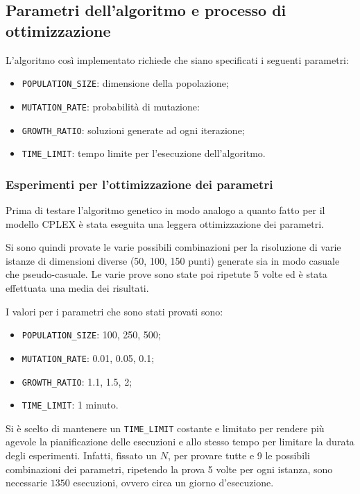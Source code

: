 \subsection{Parametri dell'algoritmo e processo di ottimizzazione}

L'algoritmo così implementato richiede che siano specificati i seguenti parametri:

\begin{itemize}
	\item\texttt{POPULATION\_SIZE}: dimensione della popolazione;
	\item\texttt{MUTATION\_RATE}: probabilità di mutazione:
	\item\texttt{GROWTH\_RATIO}: soluzioni generate ad ogni iterazione;
	\item\texttt{TIME\_LIMIT}: tempo limite per l'esecuzione dell'algoritmo.
\end{itemize}

\subsubsection{Esperimenti per l'ottimizzazione dei parametri}

Prima di testare l'algoritmo genetico in modo analogo a quanto fatto per il modello CPLEX è stata eseguita una leggera ottimizzazione dei parametri.

Si sono quindi provate le varie possibili combinazioni per la risoluzione di varie istanze di dimensioni diverse (50, 100, 150 punti) generate sia in modo casuale che pseudo-casuale.
Le varie prove sono state poi ripetute 5 volte ed è stata effettuata una media dei risultati.

I valori per i parametri che sono stati provati sono:

\begin{itemize}
	\item \texttt{POPULATION\_SIZE}: 100, 250, 500;
	\item \texttt{MUTATION\_RATE}: 0.01, 0.05, 0.1;
	\item \texttt{GROWTH\_RATIO}: 1.1, 1.5, 2;
	\item \texttt{TIME\_LIMIT}: 1 minuto.
\end{itemize}

Si è scelto di mantenere un \texttt{TIME\_LIMIT} costante e limitato per rendere più agevole la pianificazione delle esecuzioni e allo stesso tempo per limitare la durata degli esperimenti. Infatti, fissato un $N$, per provare tutte e 9 le possibili combinazioni dei parametri, ripetendo la prova 5 volte per ogni istanza, sono necessarie $1350$ esecuzioni, ovvero circa un giorno d'esecuzione.

